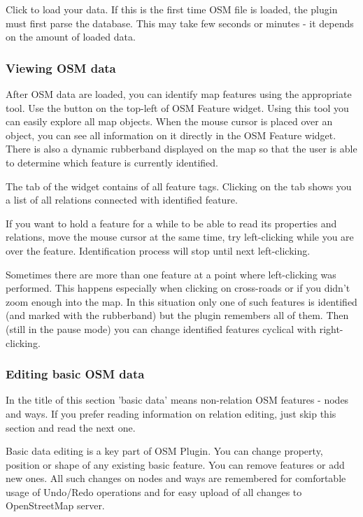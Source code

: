 Click  to load your data. If this is the first time OSM 
file is loaded, the plugin must first parse the database. This may take few 
seconds or minutes - it depends on the amount of loaded data.

\subsubsection{Viewing OSM data}

After OSM data are loaded, you can identify map features using the
appropriate tool. Use the  
button on the top-left of OSM Feature widget. Using this tool you can 
easily explore all map objects. When the mouse cursor is placed over an 
object, you can see all information on it directly in the OSM Feature widget. 
There is also a dynamic rubberband displayed on the map so that the user 
is able to determine which feature is currently identified.

The  tab of the widget contains of all feature tags. 
Clicking on the  tab shows you a list of all relations 
connected with identified feature.

If you want to hold a feature for a while to be able to read its properties 
and relations, move the mouse cursor at the same time, try left-clicking 
while you are over the feature. Identification process will stop until next 
left-clicking.

Sometimes there are more than one feature at a point where left-clicking
was performed. This happens especially when clicking on cross-roads or if 
you didn't zoom enough into the map. In this situation only one of such 
features is identified (and marked with the rubberband) but the plugin 
remembers all of them. Then (still in the pause mode) you can change 
identified features cyclical with right-clicking.

\subsubsection{Editing basic OSM data}

In the title of this section 'basic data' means non-relation OSM features -
nodes and ways. If you prefer reading information on relation editing, just
skip this section and read the next one.
 
Basic data editing is a key part of OSM Plugin. You can change property,
position or shape of any existing basic feature. You can remove features or
add new ones. All such changes on nodes and ways are remembered for 
comfortable usage of Undo/Redo operations and for easy upload of all changes
to OpenStreetMap server.

